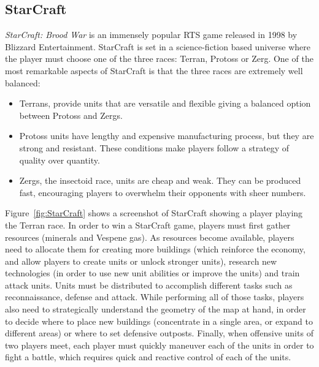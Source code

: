 \documentclass[journal]{IEEEtran}
\begin{document}
\subsection{StarCraft}\label{subsec:StarCraft}

{\em StarCraft: Brood War} is an immensely popular RTS game released in 1998 by Blizzard Entertainment. StarCraft is set in a science-fiction based universe where the player must choose one of the three races: Terran, Protoss or Zerg. One of the most remarkable aspects of StarCraft is that the three races are extremely well balanced:

\begin{itemize}
	\item Terrans, provide units that are versatile and flexible giving a balanced option between Protoss and Zergs.
	\item Protoss units have lengthy and expensive manufacturing process, but they are strong and resistant. These conditions make players follow a strategy of quality over quantity.
	\item Zergs, the insectoid race, units are cheap and weak. They can be produced fast, encouraging players to overwhelm their opponents with sheer numbers.
\end{itemize}


Figure~\ref{fig:StarCraft} shows a screenshot of StarCraft showing a player playing the Terran race. In order to win a StarCraft game, players must first gather resources (minerals and Vespene gas). As resources become available, players need to allocate them for creating more buildings (which reinforce the economy, and allow players to create units or unlock stronger units), research new technologies (in order to use new unit abilities or improve the units) and train attack units. Units must be distributed to accomplish different tasks such as reconnaissance, defense and attack. While performing all of those tasks, players also need to strategically understand the geometry of the map at hand, in order to decide where to place new buildings (concentrate in a single area, or expand to different areas) or where to set defensive outposts. Finally, when offensive units of two players meet, each player must quickly maneuver each of the units in order to fight a battle, which requires quick and reactive control of each of the units.
\end{document}
